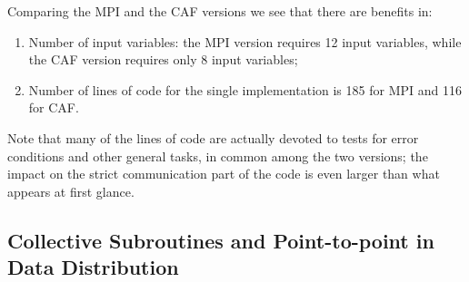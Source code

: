 \documentclass{IOS-Book-Article}
\begin{document}
Comparing the  MPI and the CAF versions we see that there are benefits
in: 
\begin{enumerate}
\item Number of input variables: the MPI version requires 12 input
  variables, while the CAF version requires only 8 input variables; 
\item Number of lines of code for the single implementation is 185 for
  MPI and 116 for CAF.   
\end{enumerate}
Note that many of the lines of code are actually devoted to  tests for error
conditions and other general tasks,  in common among the two versions;
the impact on the strict communication part of the code is even larger
than what appears at first glance. 
  
\subsection{Collective Subroutines and Point-to-point in Data Distribution}
\end{document}
